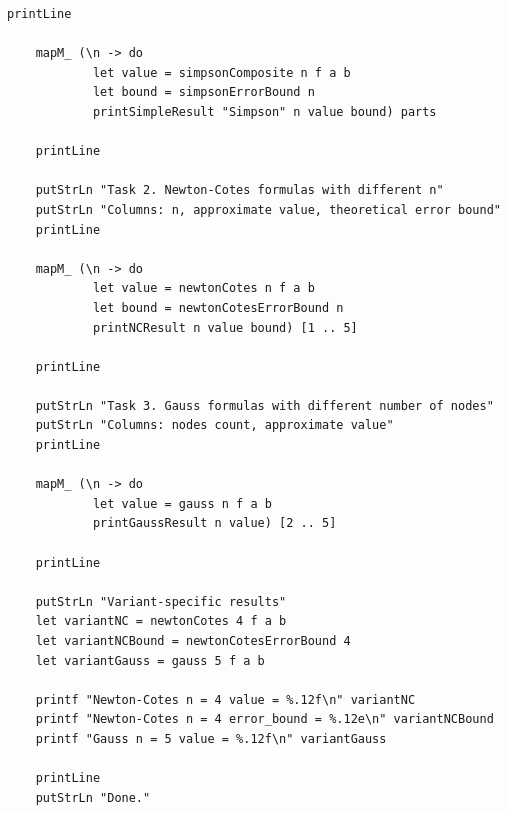 \documentclass[14pt,a4paper]{extarticle}
\begin{document}
\begin{lstlisting}[caption={Файл Main.hs}, label={lst:lab6code}]
    printLine

    mapM_ (\n -> do
            let value = simpsonComposite n f a b
            let bound = simpsonErrorBound n
            printSimpleResult "Simpson" n value bound) parts

    printLine

    putStrLn "Task 2. Newton-Cotes formulas with different n"
    putStrLn "Columns: n, approximate value, theoretical error bound"
    printLine

    mapM_ (\n -> do
            let value = newtonCotes n f a b
            let bound = newtonCotesErrorBound n
            printNCResult n value bound) [1 .. 5]

    printLine

    putStrLn "Task 3. Gauss formulas with different number of nodes"
    putStrLn "Columns: nodes count, approximate value"
    printLine

    mapM_ (\n -> do
            let value = gauss n f a b
            printGaussResult n value) [2 .. 5]

    printLine

    putStrLn "Variant-specific results"
    let variantNC = newtonCotes 4 f a b
    let variantNCBound = newtonCotesErrorBound 4
    let variantGauss = gauss 5 f a b

    printf "Newton-Cotes n = 4 value = %.12f\n" variantNC
    printf "Newton-Cotes n = 4 error_bound = %.12e\n" variantNCBound
    printf "Gauss n = 5 value = %.12f\n" variantGauss

    printLine
    putStrLn "Done."
\end{lstlisting}
\end{document}
